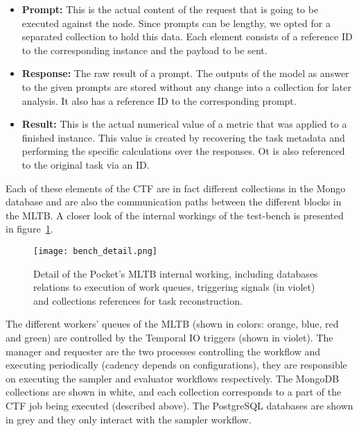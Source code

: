 \begin{itemize}
    \item \textbf{Prompt:} This is the actual content of the request that is going to be executed against the node. Since prompts can be lengthy, we opted for a separated collection to hold this data. Each element consists of a reference ID to the corresponding instance and the payload to be sent.
    \item \textbf{Response:} The raw result of a prompt. The outputs of the model as answer to the given prompts are stored without any change into a collection for later analysis. It also has a reference ID to the corresponding prompt.
    \item \textbf{Result:} This is the actual numerical value of a metric that was applied to a finished instance. This value is created by recovering the task metadata and performing the specific calculations over the responses. Ot is also referenced to the original task via an ID.
\end{itemize}

Each of these elements of the \gls{CTF} are in fact different collections in the Mongo database and are also the communication paths between the different blocks in the \gls{MLTB}. A closer look of the internal workings of the test-bench is presented in figure~\ref{fig:bench_detail}.
\begin{figure}[H]
    \centering
    \texttt{[image: bench\_detail.png]}
    \caption{Detail of the Pocket's \gls{MLTB} internal working, including databases relations to execution of work queues, triggering signals (in violet) and collections references for task reconstruction.}
    \label{fig:bench_detail}
\end{figure} 
The different workers' queues of the \gls{MLTB} (shown in colors: orange, blue, red and green) are controlled by the Temporal IO triggers (shown in violet). The manager and requester are the two processes controlling the workflow and executing periodically (cadency depends on configurations), they are responsible on executing the sampler and evaluator workflows respectively. The MongoDB collections are shown in white, and each collection corresponds to a part of the \gls{CTF} job being executed (described above). The PostgreSQL databases are shown in grey and they only interact with the sampler workflow.

